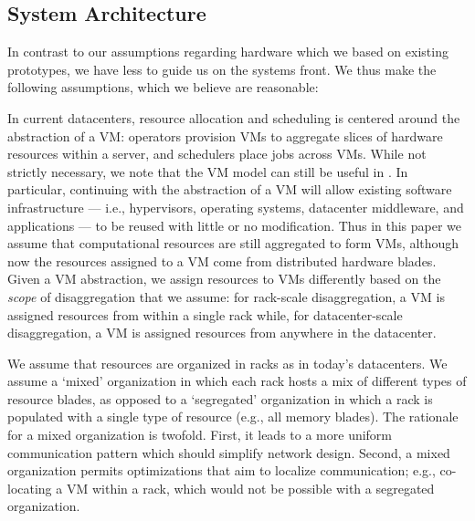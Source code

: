 \subsection{System Architecture}
\vspace{-0.05in}
\label{ssec:system}
In contrast to our assumptions regarding hardware which we based on existing  prototypes, we have less to guide us on the systems front. We thus make the following assumptions, which we believe are reasonable: 


In current datacenters, resource allocation and scheduling is centered around the abstraction of a VM: 
operators provision VMs to aggregate slices of hardware resources within a server, and schedulers place jobs across VMs. 
While not strictly necessary, we note that the VM model can still be useful in \dis. In particular, continuing with the abstraction of a VM will allow existing software infrastructure --- i.e., hypervisors, operating systems, datacenter middleware, and applications --- to be reused with little or no modification. Thus in this paper we assume that computational resources are still aggregated to form VMs, although now the resources assigned to a VM come from distributed hardware blades. Given a VM abstraction, we assign resources to VMs differently based on the \emph{scope} of disaggregation that we assume: for rack-scale disaggregation, a VM is assigned resources from within a single rack while, for datacenter-scale disaggregation, a VM is assigned resources from anywhere in the datacenter.


We assume that resources are organized in racks as in today's datacenters. 
We assume a `mixed' organization in which each rack hosts a mix of different types of resource blades, as opposed to a `segregated' organization in which a rack is populated with a single type of resource (e.g., all memory blades). The rationale for a mixed organization is twofold. 
First, it leads to a more uniform communication pattern which should simplify network design. 
Second, a mixed organization permits optimizations that aim to localize communication; e.g., co-locating a VM within a rack, which would not be possible with a segregated organization. 


